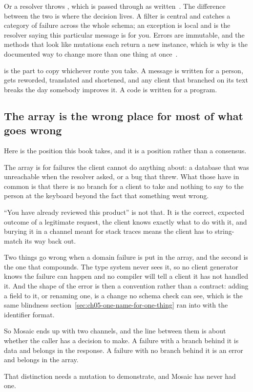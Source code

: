 Or a resolver throws , which is passed through as
written~\autocite{chillicream2026errors}. The difference between the two is
where the decision lives. A filter is central and catches a category of failure
across the whole schema; an exception is local and is the resolver saying this
particular message is for you. Errors are immutable, and the methods that look
like mutations each return a new instance, which is why
 is the documented way to change more than one
thing at once~\autocite{chillicream2026errors}.

 is the part to copy whichever route you take. A message is
written for a person, gets reworded, translated and shortened, and any client
that branched on its text breaks the day somebody improves it. A code is written
for a program.

\subsection*{The array is the wrong place for most of what goes wrong}

%
Here is the position this book takes, and it is a position rather than a
consensus.

The  array is for failures the client cannot do anything about: a
database that was unreachable when the resolver asked, or a bug that threw.
What those have in common is that there is no branch for a client to take and
nothing to say to the person at the keyboard beyond the fact that something went
wrong.

\enquote{You have already reviewed this product} is not that. It is the correct,
expected outcome of a legitimate request, the client knows exactly what to do
with it, and burying it in a channel meant for stack traces means the client has
to string-match its way back out.

Two things go wrong when a domain failure is put in the array, and the second is
the one that compounds. The type system never sees it, so no client generator
knows the failure can happen and no compiler will tell a client it has not
handled it. And the shape of the error is then a convention rather than a
contract: adding a field to it, or renaming one, is a change no schema check can
see, which is the same blindness
section~\ref{sec:ch05-one-name-for-one-thing} ran into with the identifier
format.

%
So Mosaic ends up with two channels, and the line between them is about whether
the caller has a decision to make. A failure with a branch behind it is data and
belongs in the response. A failure with no branch behind it is an error and
belongs in the array.

That distinction needs a mutation to demonstrate, and Mosaic has never had one.
